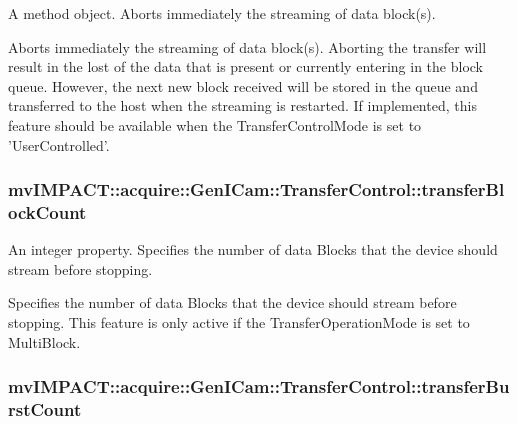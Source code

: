 A method object. Aborts immediately the streaming of data block(s). 

Aborts immediately the streaming of data block(s). Aborting the transfer will result in the lost of the data that is present or currently entering in the block queue. However, the next new block received will be stored in the queue and transferred to the host when the streaming is restarted. If implemented, this feature should be available when the Transfer\+Control\+Mode is set to 'User\+Controlled'. \hypertarget{classmv_i_m_p_a_c_t_1_1acquire_1_1_gen_i_cam_1_1_transfer_control_a67b449afd5b111ba4b2d6fe6c3e3abcd}{
\subsubsection[{transfer\+Block\+Count}]{ mv\+I\+M\+P\+A\+C\+T\+::acquire\+::\+Gen\+I\+Cam\+::\+Transfer\+Control\+::transfer\+Block\+Count}}\label{classmv_i_m_p_a_c_t_1_1acquire_1_1_gen_i_cam_1_1_transfer_control_a67b449afd5b111ba4b2d6fe6c3e3abcd}


An integer property. Specifies the number of data Blocks that the device should stream before stopping. 

Specifies the number of data Blocks that the device should stream before stopping. This feature is only active if the Transfer\+Operation\+Mode is set to Multi\+Block. \hypertarget{classmv_i_m_p_a_c_t_1_1acquire_1_1_gen_i_cam_1_1_transfer_control_a58f6ddf7cff063b677c1c6642f9b86c7}{
\subsubsection[{transfer\+Burst\+Count}]{ mv\+I\+M\+P\+A\+C\+T\+::acquire\+::\+Gen\+I\+Cam\+::\+Transfer\+Control\+::transfer\+Burst\+Count}}\label{classmv_i_m_p_a_c_t_1_1acquire_1_1_gen_i_cam_1_1_transfer_control_a58f6ddf7cff063b677c1c6642f9b86c7}


